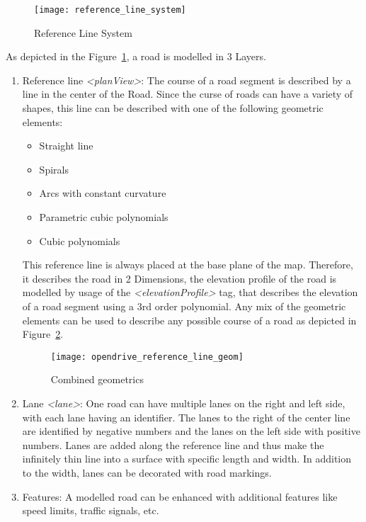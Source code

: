                 \begin{figure}[H]
                   \centering
                   \texttt{[image: reference\_line\_system]}
                   \caption{Reference Line System \cite{openDrive}}
                   \label{fig:ref-line-sys}
                \end{figure}
                As depicted in the Figure~\ref{fig:ref-line-sys}, a road is modelled in 3 Layers.
                \begin{enumerate}
                    \item Reference line \textit{<planView>}: The course of a road segment is described by a line in the center of the Road.
                        Since the curse of roads can have a variety of shapes, this line can be described with one of the following geometric elements\cite{openDrive}:
                        \begin{itemize}
                            \item Straight line
                            \item Spirals
                            \item Arcs with constant curvature
                            \item Parametric cubic polynomials
                            \item Cubic polynomials
                        \end{itemize}
                        This reference line is always placed at the base plane of the map.
                        Therefore, it describes the road in 2 Dimensions, the elevation profile of the road is modelled by usage of the \textit{<elevationProfile>} tag, that describes the elevation of a road segment using a 3rd order polynomial.
                        Any mix of the geometric elements can be used to describe any possible course of a road as depicted in Figure~\ref{fig:opendrive-geom}.
                        \begin{figure}[H]
                            \centering
                            \texttt{[image: opendrive\_reference\_line\_geom]}
                            \caption{Combined geometrics~\cite{openDrive}}
                            \label{fig:opendrive-geom}
                        \end{figure}
                    \item Lane \textit{<lane>}: One road can have multiple lanes on the right and left side, with each lane having an identifier.
                        The lanes to the right of the center line are identified by negative numbers and the lanes on the left side with positive numbers.
                        Lanes are added along the reference line and thus make the infinitely thin line into a surface with specific length and width.
                        In addition to the width, lanes can be decorated with road markings.
                    \item Features: A modelled road can be enhanced with additional features like speed limits, traffic signals, etc.
                \end{enumerate}

